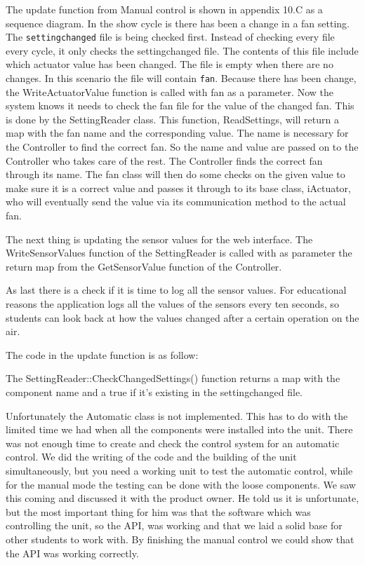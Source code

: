 \documentclass[a4paper,oneside]{book}
\begin{document}
The update function from Manual control is shown in appendix 10.C as a sequence
diagram. In the show cycle is there has been a change in a fan setting. The
\lstinline|settingchanged| file is being checked first. Instead of checking
every file every cycle, it only checks the settingchanged file. The contents of
this file include which actuator value has been changed. The file is empty when
there are no changes. In this scenario the file will contain \lstinline|fan|.
Because there has been change, the WriteActuatorValue function is called with
fan as a parameter.  Now the system knows it needs to check the fan file for
the value of the changed fan. This is done by the SettingReader class. This
function, ReadSettings, will return a map with the fan name and the
corresponding value.  The name is necessary for the Controller to find the
correct fan. So the name and value are passed on to the Controller who takes
care of the rest. The Controller finds the correct fan through its name. The
fan class will then do some checks on the given value to make sure it is a
correct value and passes it through to its base class, iActuator,  who will
eventually send the value via its communication method to the actual fan.

The next thing is updating the sensor values for the web interface. The
WriteSensorValues function of the SettingReader is called with as parameter the
return map from the GetSensorValue function of the Controller.

As last there is a check if it is time to log all the sensor values. For
educational reasons the application logs all the values of the sensors every
ten seconds, so students can look back at how the values changed after a
certain operation on the air.

The code in the update function is as follow:



The SettingReader::CheckChangedSettings() function returns a map with the
component name and a true if it's existing in the settingchanged file.





Unfortunately the Automatic class is not implemented. This has to do with the
limited time we had when all the components were installed into the unit. There
was not enough time to create and check the control system for an automatic
control. We did the writing of the code and the building of the unit
simultaneously, but you need a working unit to test the automatic control,
while for the manual mode the testing can be done with the loose components. We
saw this coming and discussed it with the product owner. He told us it is
unfortunate, but the most important thing for him was that the software which
was controlling the unit, so the API, was working and that we laid a solid base
for other students to work with. By finishing the manual control we could show
that the API was working correctly.
\end{document}
